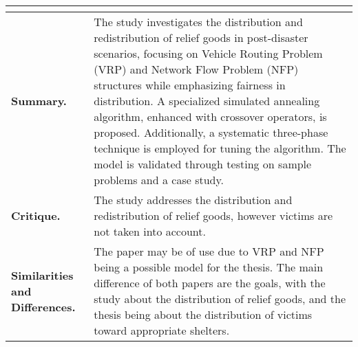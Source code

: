 \begin{longtable}{|L{.2\linewidth}|L{.74\linewidth}|}
	\hline
	\\ \hline
	\textbf{Summary.} & The study investigates the distribution and redistribution of relief goods in post-disaster scenarios, focusing on Vehicle Routing Problem (VRP) and Network Flow Problem (NFP) structures while emphasizing fairness in distribution. A specialized simulated annealing algorithm, enhanced with crossover operators, is proposed. Additionally, a systematic three-phase technique is employed for tuning the algorithm. The model is validated through testing on sample problems and a case study.\\ \hline
	\textbf{Critique.} & The study addresses the distribution and redistribution of relief goods, however victims are not taken into account.\\ \hline
	\textbf{Similarities and Differences.} & The paper may be of use due to VRP and NFP being a possible model for the thesis.	The main difference of both papers are the goals, with the study about the distribution of relief goods, and the thesis being about the distribution of victims toward appropriate shelters.\\ \hline
\end{longtable}
